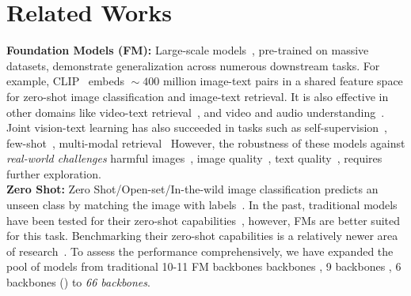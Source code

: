 \section{Related Works}
\label{sec:related_works}
\noindent \textbf{Foundation Models (FM):} 
Large-scale models~\citep{kirillov2023segment, girdhar2023imagebind}, pre-trained on massive datasets, demonstrate generalization across numerous downstream tasks. 
For example, CLIP~\citep{radford2021learning} embeds $\!\sim\!400$ million image-text pairs in a shared feature space for zero-shot image classification and image-text retrieval. It is also effective in other domains like video-text retrieval~\citep{luo2022clip4clip}, and video and audio understanding~\citep{lin2022frozen, guzhov2022audioclip}.
Joint vision-text learning has also succeeded in tasks such as self-supervision~\citep{ miech2020end}, few-shot~\citep{alayrac2022flamingo}, multi-modal retrieval~\citep{yu2022coca} \etc
However, the robustness of these models against \textit{real-world challenges} \eg harmful images~\citep{qu2024unsafebench}, image quality~\citep{wu2023q}, text quality~\citep{Xu2024}, \etc requires further exploration. \vspace{3pt}\\
\noindent \textbf{Zero Shot:} Zero Shot/Open-set/In-the-wild image classification predicts an unseen class by matching the image with labels~\citep{sun2023eva}.
In the past, traditional models have been tested for their zero-shot capabilities~\citep{chao2016empirical, xian2017zero}, however, FMs are better suited for this task. 
Benchmarking their zero-shot capabilities is a relatively newer area of research~\citep{schiappa2023probing, Schulter_2023_ICCV}.
To assess the performance comprehensively, 
we have expanded the pool of models from traditional 10-11 FM backbones  backbones \citep{NEURIPS2022_3c4688b6}, 9 backbones \citep{liu2024few}, 6 backbones (\citep{zhang2024progressive}) \etc to \textit{66 backbones}. \vspace{3pt}\\
